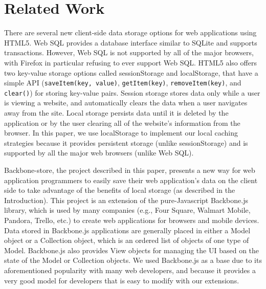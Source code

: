 \documentclass[12pt]{article}
\begin{document}
\section{Related Work}

There are several new client-side data storage options for web applications
using HTML5. Web SQL provides a database interface similar to SQLite and supports
transactions. However, Web SQL is not supported by all of the major browsers,
with Firefox in particular refusing to ever support Web SQL. HTML5 also offers two key-value storage options called sessionStorage and localStorage, that have a simple API (\verb=saveItem(key, value)=, \verb=getItem(key)=,
\verb=removeItem(key)=, and \verb=clear()=) for storing key-value pairs. 
Session storage stores data only while a user is viewing a website, and
automatically clears the data when a user navigates away from the site. Local
storage persists data until it is deleted by the application or by the user
clearing all of the website's information from the browser. In this paper, we use localStorage to implement our local caching strategies because it provides persistent storage (unlike sessionStorage) and is supported by all the major web browsers (unlike Web SQL). 

Backbone-store, the project described in this paper, presents a new way for web
application programmers to easily save their web application's data on the
client side to take advantage of the benefits of local storage (as described in the Introduction). This project is an extension of the pure-Javascript Backbone.js \cite{backbone} library, which is used by many companies (e.g., Four Square, Walmart Mobile, Pandora, Trello, etc.) to create web applications for browsers and mobile devices. Data
stored in Backbone.js applications are generally placed in either a Model
object or a Collection object, which is an ordered list of objects of one type
of Model. Backbone.js also provides View objects for managing the UI based on
the state of the Model or Collection objects. We used Backbone.js as a base due
to its aforementioned popularity with many web developers, and because it
provides a very good model for developers that is easy to modify with our extensions.
\end{document}
